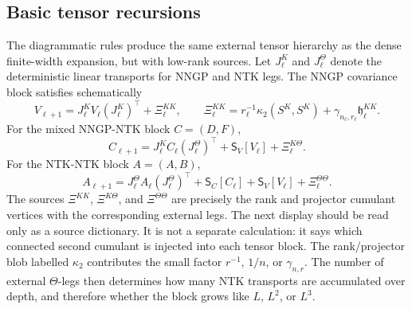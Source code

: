 \documentclass{article}
\begin{document}
\subsection{Basic tensor recursions}
The diagrammatic rules produce the same external tensor hierarchy as the dense finite-width expansion, but with low-rank sources. Let \(J^K_\ell\) and \(J^\Theta_\ell\) denote the deterministic linear transports for NNGP and NTK legs. The NNGP covariance block satisfies schematically
\begin{equation}
V_{\ell+1}
=J^K_\ell V_\ell (J^K_\ell)^\top+\Xi^{KK}_\ell,
\qquad
\Xi^{KK}_\ell
=r_\ell^{-1}\kappa_2(S^K,S^K)
+\gamma_{n_\ell,r_\ell}\mathfrak h^{KK}_\ell.
\label{eq:appendix-V-rec}
\end{equation}
For the mixed NNGP-NTK block \(C=(D,F)\),
\begin{equation}
C_{\ell+1}
=J^K_\ell C_\ell (J^\Theta_\ell)^\top
+\mathsf S_V[V_\ell]
+\Xi^{K\Theta}_\ell.
\label{eq:appendix-C-rec}
\end{equation}
For the NTK-NTK block \(A=(A,B)\),
\begin{equation}
A_{\ell+1}
=J^\Theta_\ell A_\ell (J^\Theta_\ell)^\top
+\mathsf S_C[C_\ell]+\mathsf S_V[V_\ell]
+\Xi^{\Theta\Theta}_\ell.
\label{eq:appendix-A-rec}
\end{equation}
The sources \(\Xi^{KK}\), \(\Xi^{K\Theta}\), and \(\Xi^{\Theta\Theta}\) are precisely the rank and projector cumulant vertices with the corresponding external legs. The next display should be read only as a source dictionary. It is not a separate calculation: it says which connected second cumulant is injected into each tensor block. The rank/projector blob labelled \(\kappa_2\) contributes the small factor \(r^{-1}\), \(1/n\), or \(\gamma_{n,r}\). The number of external \(\Theta\)-legs then determines how many NTK transports are accumulated over depth, and therefore whether the block grows like \(L\), \(L^2\), or \(L^3\).
\end{document}
